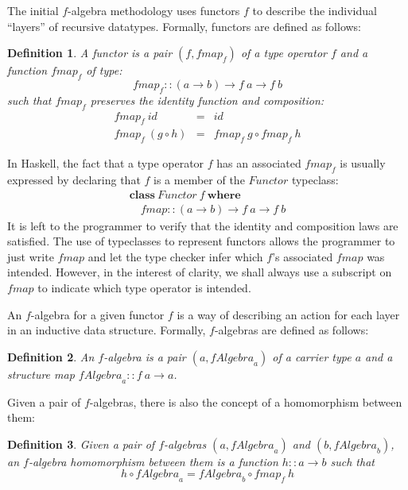 \documentclass{jfp1}
\newtheorem{definition}{Definition}
\newcommand{\kw}[1]{\textbf{#1}}
\begin{document}
The initial $f$-algebra methodology uses functors $f$ to describe the
individual ``layers'' of recursive datatypes.
Formally, functors are defined as follows:
\begin{definition}\label{defn:functor}
  A \emph{functor} is a pair $(f, \mathit{fmap}_f)$ of a type operator
  $f$ and a function $\mathit{fmap}_f$ of type:
  \begin{displaymath}
    \mathit{fmap}_f :: (a \to b) \to f~a \to f~b
  \end{displaymath}
  such that $\mathit{fmap}_f$ preserves the identity function and
  composition:
  \begin{eqnarray}
    \label{eq:fmap-id}
    \mathit{fmap}_f~\mathit{id} & = & \mathit{id} \\
    \label{eq:fmap-comp}
    \mathit{fmap}_f~(g \circ h) & = & \mathit{fmap}_f~g \circ \mathit{fmap}_f~h
  \end{eqnarray}
\end{definition}

In Haskell, the fact that a type operator $f$ has an associated
$\mathit{fmap}_f$ is usually expressed by declaring that $f$ is a
member of the $\mathit{Functor}$ typeclass:
\begin{displaymath}
  \begin{array}{l}
    \kw{class}~\mathit{Functor}~f~\kw{where} \\
    \quad \mathit{fmap} :: (a \to b) \to f~a \to f~b
  \end{array}
\end{displaymath}
It is left to the programmer to verify that the identity and
composition laws are satisfied.  The use of typeclasses to represent functors allows
the programmer to just write $\mathit{fmap}$ and let the type checker
infer which $f$'s associated $\mathit{fmap}$ was intended. However, in
the interest of clarity, we shall always use a subscript on
$\mathit{fmap}$ to indicate which type operator is intended.

An $f$-algebra for a given functor $f$ is a way of describing an
action for each layer in an inductive data structure. Formally,
$f$-algebras are defined as follows:
\begin{definition}
  An \emph{$f$-algebra} is a pair $(a, \mathit{fAlgebra}_a)$ of a
  \emph{carrier type} $a$ and a \emph{structure map}
  $\mathit{fAlgebra}_a :: f~a \to a$.
\end{definition}
Given a pair of $f$-algebras, there is also the concept of a
homomorphism between them:
\begin{definition}
  Given a pair of $f$-algebras $(a,\mathit{fAlgebra}_a)$ and $(b,
  \mathit{fAlgebra}_b)$, an \emph{$f$-algebra homomorphism} between them is a
  function $h :: a \to b$ such that
  \begin{equation}
    \label{eq:falgebra-homomorphism}
    h \circ \mathit{fAlgebra}_a = \mathit{fAlgebra}_b \circ \mathit{fmap}_f~h
  \end{equation}
\end{definition}
\end{document}
